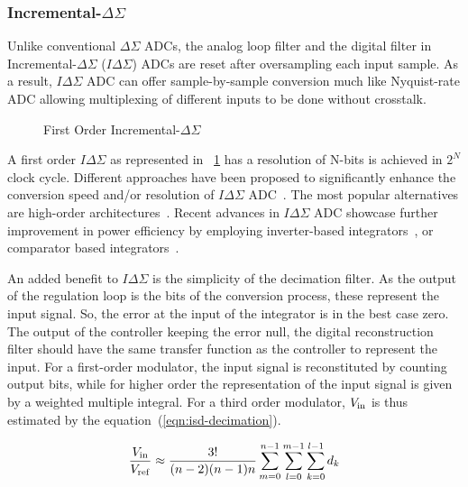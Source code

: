 \subsubsection{Incremental-\(\Delta\Sigma \)}
\label{sec:soa-isd}
Unlike conventional \(\Delta\Sigma \) ADCs, the analog loop filter and the digital filter in Incremental-\(\Delta\Sigma \) (\(I\Delta\Sigma \)) ADCs are reset after oversampling each input sample. As a result, \(I\Delta\Sigma \) ADC can offer sample-by-sample conversion much like Nyquist-rate ADC allowing multiplexing of different inputs to be done without crosstalk.

\begin{figure}[htp]
	\centering
	\resizebox{\textwidth}{!} {}
	\caption{First Order Incremental-\(\Delta\Sigma \)}
	\label{fig:isd_first_order_principle}
\end{figure}

A first order \(I\Delta\Sigma \) as represented in \figurename~\ref{fig:isd_first_order_principle} has a resolution of N-bits is achieved in \(2^N \) clock cycle. Different approaches have been proposed to significantly enhance the conversion speed and/or resolution of \(I\Delta\Sigma \) ADC~\cite{Markus2004,Quiquempoix2006,Caldwell2010}. The most popular alternatives are high-order architectures~\cite{Au1997,Babanezhad1991,Baird1996}. Recent advances in \(I\Delta\Sigma \) ADC showcase further improvement in power efficiency by employing inverter-based integrators~\cite{Chae2009}, or comparator based integrators~\cite{Yamamoto2012}.

An added benefit to \(I\Delta\Sigma \) is the simplicity of the decimation filter. As the output of the regulation loop is the bits of the conversion process, these represent the input signal. So, the error at the input of the integrator is in the best case zero. The output of the controller keeping the error null, the digital reconstruction filter should have the same transfer function as the controller to represent the input. For a first-order modulator, the input signal is reconstituted by counting output bits, while for higher order the representation of the input signal is given by a weighted multiple integral. For a third order modulator, \(V_{\rm in}\) is thus estimated by the equation~(\ref{eqn:isd-decimation}).

\begin{equation}
	\frac{V_{\rm in}}{V_{\rm ref}}\approx \frac{3!}{(n-2)(n-1)n}\sum_{m=0}^{n-1}\sum_{l=0}^{m-1}\sum_{k=0}^{l-1}d_{k}
\label{eqn:isd-decimation}
\end{equation}

